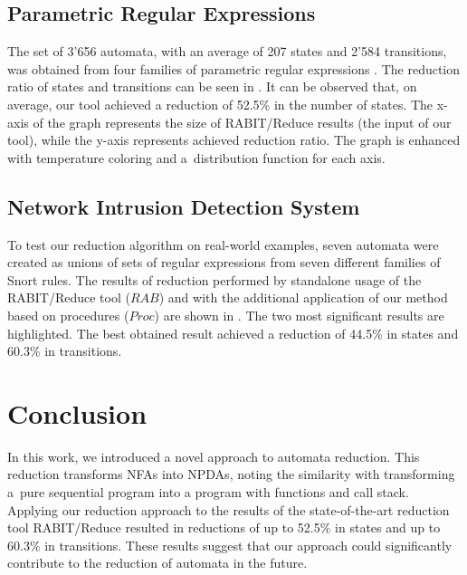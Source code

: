\documentclass{ExcelAtFIT}
\begin{document}
	\subsection{Parametric Regular Expressions}
		The set of 3'656 automata, with an average of 207 states and 2'584 transitions, was obtained from four families of parametric regular expressions \cite{Regex_param}. The reduction ratio of states and transitions can be seen in . It can be observed that, on average, our tool achieved a reduction of 52.5\% in the number of states. The x-axis of the graph represents the size of RABIT/Reduce results (the input of our tool), while the y-axis represents achieved reduction ratio. The graph is enhanced with temperature coloring and a~distribution function for each axis.

	\subsection{Network Intrusion Detection System}
		To test our reduction algorithm on real-world examples, seven automata were created as unions of sets of regular expressions from seven different families of Snort rules. The results of reduction performed by standalone usage of the RABIT/Reduce tool ($RAB$) and with the additional application of our method based on procedures ($\mathit{Proc}$) are shown in . The two most significant results are highlighted. The best obtained result achieved a reduction of 44.5\% in states and 60.3\% in transitions.

\section{Conclusion}
	In this work, we introduced a novel approach to automata reduction. This reduction transforms NFAs into NPDAs, noting the similarity with transforming a~pure sequential program into a program with functions and call stack. Applying our reduction approach to the results of the state-of-the-art reduction tool RABIT/Reduce resulted in reductions of up to 52.5\% in states and up to 60.3\% in transitions. These results suggest that our approach could significantly contribute to the reduction of automata in the future.






\end{document}

